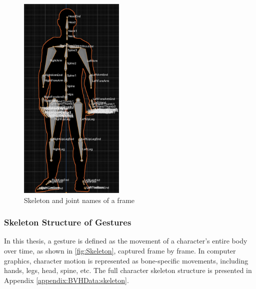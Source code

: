 
\begin{figure}[h]
	\centering
	\centering
	\includegraphics[height=10cm]{images/Skeleton.png}
	\caption{\small Skeleton and joint names of a frame}
	\label{fig:Skeleton}
\end{figure}

\subsubsection{Skeleton Structure of Gestures}

In this thesis, a gesture is defined as the movement of a character's entire body over time, as shown in \autoref{fig:Skeleton}, captured frame by frame. In computer graphics, character motion is represented as bone-specific movements, including hands, legs, head, spine, etc. The full character skeleton structure is presented in Appendix \autoref{appendix:BVHData:skeleton}.

